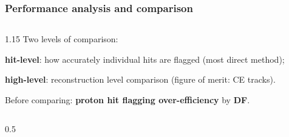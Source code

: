 \documentclass{beamer}
\begin{document}
\begin{frame}
\frametitle{Performance analysis and comparison}
           \vspace{-1mm}
  \begin{columns}
        \begin{column}{1.15\framewidth}
       {\small Two levels of comparison:}
    \setlength{\leftmargini}{1.2em}
    \begin{itemize}
      {\small  \item \textbf{hit-level}: how accurately individual hits are flagged (most direct method);
    \item \textbf{high-level}: reconstruction level comparison (figure of merit: CE tracks).
    \vspace{-1mm}
\item Before comparing: \textbf{proton hit flagging over-efficiency} by \textbf{DF}.}
    \end{itemize}
    \end{column}
    \end{columns}
        \vspace{-2mm}
    \begin{columns}
        \begin{column}{0.5\framewidth}


\end{column}
\end{columns}
\end{frame}
\end{document}
